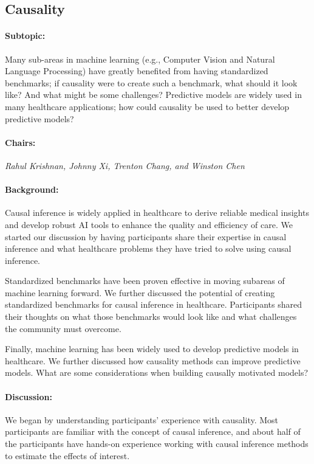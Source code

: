 \subsection{Causality}

\paragraph{Subtopic:} Many sub-areas in machine learning (e.g., Computer Vision and Natural Language Processing) have greatly benefited from having standardized benchmarks; if causality were to create such a benchmark, what should it look like? And what might be some challenges? Predictive models are widely used in many healthcare applications; how could causality be used to better develop predictive models?

\paragraph{Chairs:}
\textit{Rahul Krishnan, Johnny Xi, Trenton Chang, and Winston Chen}

\paragraph{Background:} 
Causal inference is widely applied in healthcare to derive reliable medical insights and develop robust AI tools to enhance the quality and efficiency of care. We started our discussion by having participants share their expertise in causal inference and what healthcare problems they have tried to solve using causal inference.

Standardized benchmarks have been proven effective in moving subareas of machine learning forward. We further discussed the potential of creating standardized benchmarks for causal inference in healthcare. Participants shared their thoughts on what those benchmarks would look like and what challenges the community must overcome. 

Finally, machine learning has been widely used to develop predictive models in healthcare. We further discussed how causality methods can improve predictive models. What are some considerations when building causally motivated models? 

\paragraph{Discussion:} 

We began by understanding participants' experience with causality. Most participants are familiar with the concept of causal inference, and about half of the participants have hands-on experience working with causal inference methods to estimate the effects of interest.

